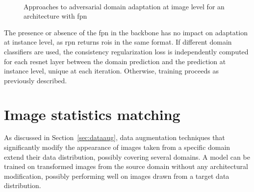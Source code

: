 \documentclass[%
    corpo=12pt,
    twoside,
    stile=classica,   
    tipotesi=magistrale,
    evenboxes,
    english,
	numerazioneromana,
]{toptesi}
\begin{document}
\begin{figure}[ht]
	\centering
	\\
	\caption{Approaches to adversarial domain adaptation at image level for an architecture with \gls{fpn}}
\end{figure}

The presence or absence of the \gls{fpn} in the backbone has no impact on adaptation at instance level, as \gls{rpn} returns \glspl{roi} in the same format. If different domain classifiers are used, the consistency regularization loss is independently computed for each \gls{resnet} layer between the domain prediction and the prediction at instance level, unique at each iteration. Otherwise, training proceeds as previously described.

\section{Image statistics matching}
As discussed in Section~\ref{sec:dataaug}, data augmentation techniques that significantly modify the appearance of images taken from a specific domain extend their data distribution, possibly covering several domains. A model can be trained on transformed images from the source domain without any architectural modification, possibly performing well on images drawn from a target data distribution.
\end{document}
